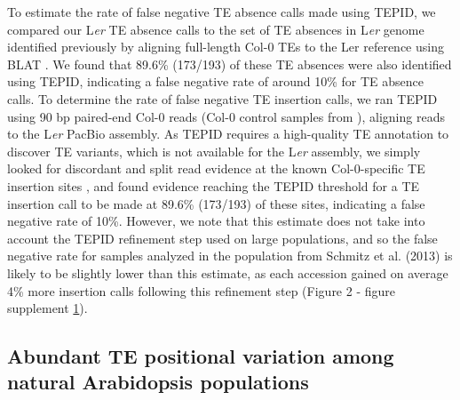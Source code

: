 \documentclass[12pt]{article}
\begin{document}
To estimate the rate of false negative TE absence calls made using
TEPID, we compared our L\emph{er} TE absence calls to the set of TE
absences in L\emph{er} genome identified previously by aligning
full-length Col-0 TEs to the Ler reference using BLAT
\cite{Quadrana:2016bi}. We found that 89.6\% (173/193) of these TE
absences were also identified using TEPID, indicating a false negative
rate of around 10\% for TE absence calls. To determine the rate of false
negative TE insertion calls, we ran TEPID using 90 bp paired-end Col-0
reads (Col-0 control samples from \cite{Jiang:2014ih}), aligning reads
to the L\emph{er} PacBio assembly. As TEPID requires a high-quality TE
annotation to discover TE variants, which is not available for the
L\emph{er} assembly, we simply looked for discordant and split read
evidence at the known Col-0-specific TE insertion sites
\cite{Quadrana:2016bi}, and found evidence reaching the TEPID threshold
for a TE insertion call to be made at 89.6\% (173/193) of these sites,
indicating a false negative rate of 10\%. However, we note that this
estimate does not take into account the TEPID refinement step used on
large populations, and so the false negative rate for samples analyzed
in the population from Schmitz et al. (2013) is likely to be slightly
lower than this estimate, as each accession gained on average 4\% more
insertion calls following this refinement step (Figure 2 - figure
supplement \hyperref[fig2s1]{1}).

\subsection{Abundant TE positional variation among natural Arabidopsis
populations}
\end{document}
